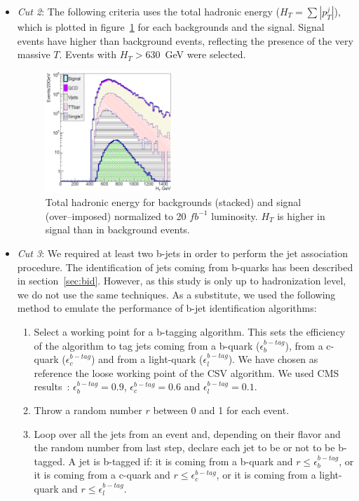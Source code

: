 \begin{itemize}
\item \textit{Cut 2}: The following criteria uses the total hadronic energy ($H_{T}=\sum |p_{T}^{j}|$), which is plotted in figure~\ref{fig:Var2} for each backgrounds and the signal. Signal events have higher \HT than background events, reflecting the presence of the very massive $T$. Events with $H_{T}>630$~GeV were selected.

\begin{figure}[!Hhtbp]
  \begin{center}
    \includegraphics[width=0.45\textwidth]{figs/Pheno/HT.png}
    \caption{Total hadronic energy for backgrounds (stacked) and signal (over--imposed) normalized to 20 $fb^{-1}$ luminosity. $H_{T}$ is higher in signal than in background events.}
    \label{fig:Var2}
  \end{center}
\end{figure}

\item \textit{Cut 3}: We required at least two b-jets in order to perform the jet association procedure. The identification of jets coming from b-quarks has been described in section~\ref{sec:bid}. However, as this study is only up to hadronization level, we do not use the same techniques. As a substitute, we used the following method to emulate the performance of b-jet identification algorithms:
  \begin{enumerate}
  \item Select a working point for a b-tagging algorithm. This sets the efficiency of the algorithm to tag jets coming from a b-quark ($\epsilon^{b-tag}_{b}$), from a c-quark ($\epsilon^{b-tag}_{c}$) and from a light-quark ($\epsilon^{b-tag}_{l}$). We have chosen as reference the loose working point of the CSV algorithm. We used CMS results~\cite{CMS-PAS-BTV-13-001}: $\epsilon^{b-tag}_{b}=0.9$, $\epsilon^{b-tag}_{c}=0.6$ and $\epsilon^{b-tag}_{l}=0.1$. 
  \item Throw a random number $r$ between 0 and 1 for each event.
  \item Loop over all the jets from an event and, depending on their flavor and the random number from last step, declare each jet to be or not to be b-tagged. A jet is b-tagged if: it is coming from a b-quark and $r\leq\epsilon^{b-tag}_{b}$, or it is coming from a c-quark and $r\leq\epsilon^{b-tag}_{c}$, or it is coming from a light-quark and $r\leq\epsilon^{b-tag}_{l}$.
  \end{enumerate}


\end{itemize}
